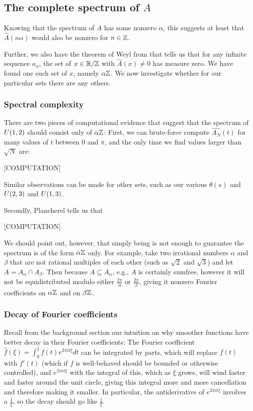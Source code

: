 \documentclass{article}
\theoremstyle{definition}
\theoremstyle{remark}
\numberwithin{equation}{section}
\begin{document}
\subsection{The complete spectrum of $A$}

Knowing that the spectrum of $A$ has some nonzero $\alpha$, this
suggests at least that $\widehat{A}(n\alpha)$ would also be nonzero
for $n \in \mathbb{Z}$.  

Further, we also have the theorem of Weyl from \cite{weyl:ann1916}
that tells us that for any infinite sequence $a_n$, the set of
$x \in \mathbb{R}/\mathbb{Z}$ with $\widehat{A}(x) \neq 0$ has measure zero.  We have
found one such set of $x$, namely $\alpha\mathbb{Z}$.  We now investigate
whether for our particular \relevant sets there are any others.

\subsubsection{Spectral complexity}

There are two pieces of computational evidence that suggest that the
spectrum of $U(1,2)$ should consist only of $\alpha\mathbb{Z}$: First, we
can brute-force compute $\widehat{A_N}(t)$ for many values of $t$
between 0 and $\pi$, and the only time we find values larger than
$\sqrt{N}$ are: 

[COMPUTATION]

Similar observations can be made for other \relevant sets, such as our
various $\theta(s)$ and $U(2,3)$ and $U(1,3)$.  

Secondly, Plancherel tells us that 

[COMPUTATION]

We should point out, however, that simply being \relevant is not enough
to guarantee the spectrum is of the form $\alpha\mathbb{Z}$ only.  For
example, take two irrational numbers $\alpha$ and $\beta$ that are not
rational multiples of each other (such as $\sqrt2$ and $\sqrt3$) and
let $A = A_\alpha \cap A_\beta$.  Then because $A \subseteq A_\alpha$,
e.g., $A$ is certainly sumfree, however it will not be equidistributed
modulo either $\frac{2\pi}{\alpha}$ or $\frac{2\pi}{\beta}$, giving it
nonzero Fourier coefficients on $\alpha\mathbb{Z}$ and on $\beta\mathbb{Z}$.  

\subsubsection{Decay of Fourier coefficients}

Recall from the background section our intuition on why smoother
functions have better decay in their Fourier coefficients: The Fourier
coefficient $\widehat{f}(\xi) = \int_0^1 f(t) e^{2\pi i t \xi} dt$ can
be integrated by parts, which will replace $f(t)$ with $f'(t)$ (which
if $f$ is well-behaved should be bounded or otherwise controlled), and
$e^{2\pi i t \xi}$ with the integral of this, which as $\xi$ grows,
will wind faster and faster around the unit circle, giving this
integral more and more cancellation and therefore making it smaller.
In particular, the antiderivative of $e^{2\pi i t \xi}$ involves a
$\frac{1}{\xi}$, so the decay should go like $\frac{1}{\xi}$.
\end{document}
